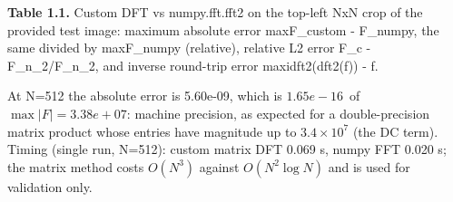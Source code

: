 \documentclass[10pt,a4paper]{article}
\begin{document}
\begin{table}[H]\centering\footnotesize{\small\textbf{Table 1.1.} Custom DFT vs numpy.fft.fft2 on the top-left NxN crop of the provided test image: maximum absolute error max\textbar{}F\_custom - F\_numpy\textbar{}, the same divided by max\textbar{}F\_numpy\textbar{} (relative), relative L2 error \textbar{}\textbar{}F\_c - F\_n\textbar{}\textbar{}\_2/\textbar{}\textbar{}F\_n\textbar{}\textbar{}\_2, and inverse round-trip error max\textbar{}idft2(dft2(f)) - f\textbar{}.\par}\vskip 3pt
\end{table}
At N=512 the absolute error is 5.60e-09, which is $1.65e-16\,$ of $\max|F|=3.38e+07$: machine precision, as expected for a double-precision matrix product whose entries have magnitude up to $3.4\times 10^{7}$ (the DC term). Timing (single run, N=512): custom matrix DFT 0.069 s, numpy FFT 0.020 s; the matrix method costs $O(N^3)$ against $O(N^2\log N)$ and is used for validation only.
\end{document}
